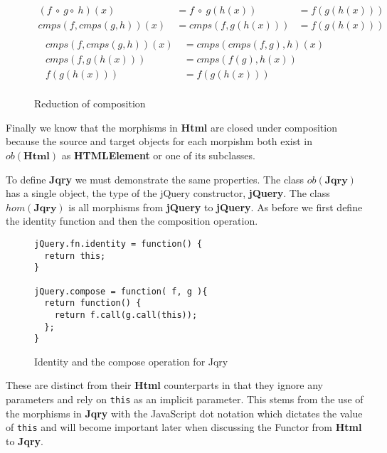 \documentclass[preprint,10pt]{sigplanconf}
\begin{document}
\begin{figure}[h!]
\begin{displaymath}
\begin{align*}
(f\ \circ\ g \circ\ h)(x)\ &= f\ \circ\ g(h(x)) &= f(g(h(x)))\\
cmps(f,cmps(g,h))(x)\ &= cmps(f, g(h(x))) &= f(g(h(x)))\\
\end{align*}
\end{displaymath}
\begin{displaymath}
\begin{align*}
cmps(f,cmps(g,h))(x)\ &= cmps(cmps(f,g),h)(x) \\
cmps(f,g(h(x)))\ &= cmps(f(g),h(x)) \\
f(g(h(x)))\ &= f(g(h(x)))\\
\end{align*}
\end{displaymath}
\nocaptionrule \caption{Reduction of composition}
\label{fig:html-associativity}
\end{figure}

Finally we know that the morphisms in \textbf{Html} are closed under composition because the source and target objects for each morpishm both exist in \begin{math}ob(\mathbf{Html})\end{math} as \textbf{HTMLElement} or one of its subclasses.

To define \textbf{Jqry} we must demonstrate the same properties. The class \begin{math}ob(\mathbf{Jqry})\end{math} has a single object, the type of the jQuery constructor, \textbf{jQuery}. The class \begin{math}hom(\mathbf{Jqry})\end{math} is all morphisms from \textbf{jQuery} to \textbf{jQuery}. As before we first define the identity function and then the composition operation.

\begin{figure}[h!]
\small
\begin{verbatim}
jQuery.fn.identity = function() {
  return this;
}

jQuery.compose = function( f, g ){
  return function() {
    return f.call(g.call(this));
  };
}
\end{verbatim}
\nocaptionrule \caption{Identity and the compose operation for Jqry}
\end{figure}

These are distinct from their \textbf{Html} counterparts in that they ignore any parameters and rely on \verb|this| as an implicit parameter. This stems from the use of the morphisms in \textbf{Jqry} with the JavaScript dot notation which dictates the value of \verb|this| and will become important later when discussing the Functor from \textbf{Html} to \textbf{Jqry}.
\end{document}
